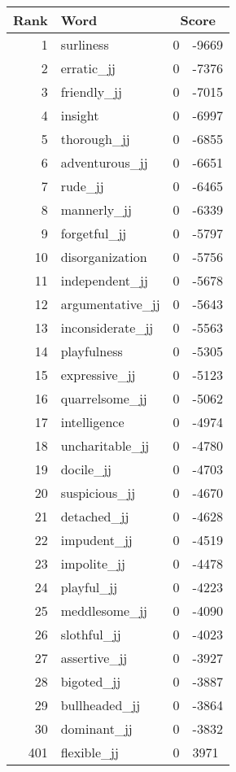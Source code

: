 \begin{longtable}[!htbp]{| rlr@{.}l |}
    \hline
    \textbf{Rank} & \textbf{Word} & \multicolumn{2}{c|}{\textbf{Score}} \\
    \hline
    \endhead
    1 & surliness & 0 & -9669 \\
    2 & erratic\_jj & 0 & -7376 \\
    3 & friendly\_jj & 0 & -7015 \\
    4 & insight & 0 & -6997 \\
    5 & thorough\_jj & 0 & -6855 \\
    6 & adventurous\_jj & 0 & -6651 \\
    7 & rude\_jj & 0 & -6465 \\
    8 & mannerly\_jj & 0 & -6339 \\
    9 & forgetful\_jj & 0 & -5797 \\
    10 & disorganization & 0 & -5756 \\
    11 & independent\_jj & 0 & -5678 \\
    12 & argumentative\_jj & 0 & -5643 \\
    13 & inconsiderate\_jj & 0 & -5563 \\
    14 & playfulness & 0 & -5305 \\
    15 & expressive\_jj & 0 & -5123 \\
    16 & quarrelsome\_jj & 0 & -5062 \\
    17 & intelligence & 0 & -4974 \\
    18 & uncharitable\_jj & 0 & -4780 \\
    19 & docile\_jj & 0 & -4703 \\
    20 & suspicious\_jj & 0 & -4670 \\
    21 & detached\_jj & 0 & -4628 \\
    22 & impudent\_jj & 0 & -4519 \\
    23 & impolite\_jj & 0 & -4478 \\
    24 & playful\_jj & 0 & -4223 \\
    25 & meddlesome\_jj & 0 & -4090 \\
    26 & slothful\_jj & 0 & -4023 \\
    27 & assertive\_jj & 0 & -3927 \\
    28 & bigoted\_jj & 0 & -3887 \\
    29 & bullheaded\_jj & 0 & -3864 \\
    30 & dominant\_jj & 0 & -3832 \\
    401 & flexible\_jj & 0 & 3971 \\

\end{longtable}
